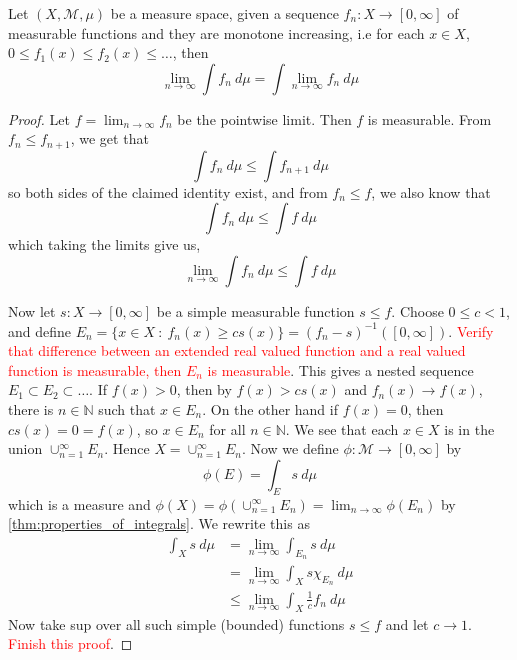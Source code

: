 \begin{theorem}
  Let $(X, \mathcal{M}, \mu)$ be a measure space, given a sequence $f_n: X \to [0, \infty]$ of measurable functions and they are monotone increasing, i.e for each $x \in X$, $0 \le f_1(x) \le f_2(x) \le \ldots $, then \[
       \lim_{n \to \infty} \int f_n \ d \mu = \int \lim_{n \to \infty} f_n \ d \mu
  \]
\end{theorem}
\begin{proof}
  Let $f = \lim_{n \to \infty} f_n$ be the pointwise limit. Then $ f$ is measurable. From $f_n \le f_{n+1}$, we get that \[
       \int f_n \ d \mu \le \int f_{n+1} \ d \mu
  \]
  so both sides of the claimed identity exist, and from $f_n \le f$, we also know that \[
       \int f_n \ d\mu \le \int f \ d \mu
  \]
  which taking the limits give us, \[
       \lim_{n \to \infty} \int f_n \ d\mu \le \int f \ d \mu
  \]

  Now let $s: X \to [0, \infty]$ be a simple measurable function $s \le f$. Choose $0 \le c < 1$, and define $ E_n = \{ x \in X \ : \ f_n(x) \ge cs(x) \} = (f_n - s)^{-1}([0, \infty])$. \textcolor{red}{Verify that difference between an extended real valued function and a real valued function is measurable, then $E_n$ is measurable}. This gives a nested sequence $E_1 \subset E_2 \subset \ldots $.
  If $ f(x) > 0$, then by $ f(x) > cs(x)$ and $  f_n(x) \to f(x)$, there is $n \in \mathbb{N}$ such that $x \in E_n$. 
  On the other hand if $f(x) = 0$, then $cs(x) = 0 = f(x)$, so $ x \in E_n$ for all $n \in \mathbb{N}$.
  We see that each $ x \in X$ is in the  union $\cup_{n = 1}^{\infty}E_n$. Hence $X = \cup_{n = 1}^{\infty}E_n$. Now we define $ \phi: \mathcal{M} \to [0, \infty]$ by \[
    \phi(E) = \int_E s \ d \mu
  \]
  which is a measure and $\phi(X) = \phi(\cup_{n = 1}^{\infty}E_n) =  \lim_{n \to \infty} \phi(E_n)$ by \autoref{thm:properties_of_integrals}. We rewrite this as \begin{align*}
    \int_X s \ d \mu &= \lim_{n \to \infty} \int_{E_n} s \ d \mu \\ 
    &= \lim_{n \to \infty} \int_X s \chi_{E_n} \ d \mu \\ 
    &\le \lim_{n \to \infty} \int_X \frac{1}{c} f_n \ d \mu
  \end{align*}
  Now take sup over all such simple (bounded) functions $s \le f$ and let $c \to 1$.
  \textcolor{red}{Finish this proof}.
\end{proof}

